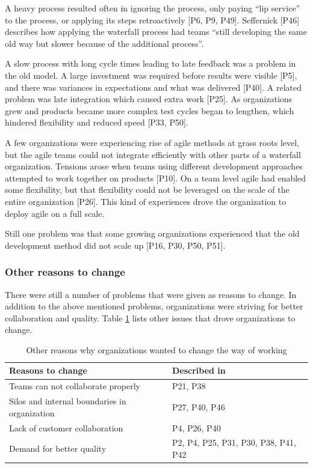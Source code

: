 \documentclass[preprint,authoryear,12pt]{elsarticle}
\begin{document}
A heavy process resulted often in ignoring the process, only paying ``lip
service'' to the process, or applying its steps retroactively [P6, P9, P49].
Seffernick [P46] describes how applying the waterfall process had teams ``still
developing the same old way but slower because of the additional process''.

A slow process with long cycle times leading to late feedback was a problem in
the old model. A large investment was required before results were visible [P5],
and there was variances in expectations and what was delivered [P40]. A related
problem was late integration which caused extra work [P25]. As organizations
grew and products became more complex test cycles began to lengthen, which
hindered flexibility and reduced speed [P33, P50].

A few organizations were experiencing rise of agile methods at grass roots
level, but the agile teams could not integrate efficiently with other parts of
a waterfall organization. Tensions arose when teams using different development
approaches attempted to work together on products [P10]. On a team level agile
had enabled some flexibility, but that flexibility could not be leveraged on the
scale of the entire organization [P26].
This kind of experiences drove the organization to deploy agile on a full scale.

Still one problem was that some growing organizations experienced that the old
development method did not scale up [P16, P30, P50, P51].


\subsubsection{Other reasons to change}

There were still a number of problems that were given as reasons to change.
In addition to the above mentioned problems, organizations were striving for
better collaboration and quality. Table \ref{table:reasonstochange_other} lists
other issues that drove organizations to change.

\begin{table}[b]
    \centering
    \begin{tabular}{ >{\raggedright\arraybackslash}p{}
                     >{\raggedright\arraybackslash}p{} }
        \toprule
        Reasons to change           &  Described in  \\
        \midrule
        Teams can not collaborate properly   &  P21, P38  \\
        Silos and internal boundaries in organization   &  P27, P40, P46  \\
        Lack of customer collaboration       &  P4, P26, P40  \\
        Demand for better quality            &  P2, P4, P25, P31, P30, P38, P41, P42  \\
        \bottomrule
    \end{tabular}
    \caption{Other reasons why organizations wanted to change the way of working}
    \label{table:reasonstochange_other}
\end{table}
\end{document}
